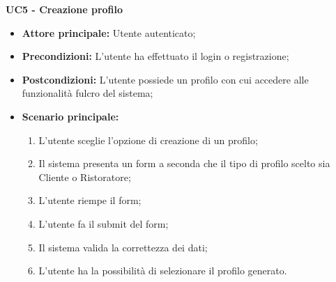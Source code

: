 \textbf{UC5 - Creazione profilo}
\begin{itemize}
    \item \textbf{Attore principale: }Utente autenticato;
    \item \textbf{Precondizioni: }L'utente ha effettuato il login o registrazione;
    \item \textbf{Postcondizioni: }L'utente possiede un profilo con cui accedere alle funzionalità fulcro del sistema;
    \item \textbf{Scenario principale:} 
        \begin{enumerate}
            \item L'utente sceglie l'opzione di creazione di un profilo;
            \item Il sistema presenta un form a seconda che il tipo di profilo scelto sia Cliente o Ristoratore;
            \item L'utente riempe il form;
            \item L'utente fa il submit del form;
            \item Il sistema valida la correttezza dei dati;
            \item L'utente ha la possibilità di selezionare il profilo generato.
        \end{enumerate}
\end{itemize}
